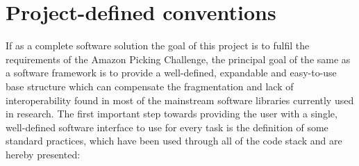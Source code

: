 \section{Project-defined conventions} \label{sec:standards}
If as a complete software solution the goal of this project is to
fulfil the requirements of the Amazon Picking Challenge, the
principal goal of the same as a software framework is to provide a
well-defined, expandable and easy-to-use base structure which can
compensate the fragmentation and lack of interoperability found in
most of the mainstream software libraries currently used in
research. The first important step towards providing the user with a
single, well-defined software interface to use for every task is the
definition of some standard practices, which have been used through
all of the code stack and are hereby presented:

